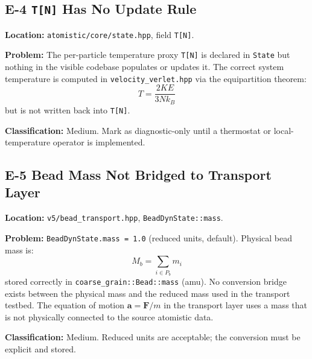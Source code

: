 \documentclass[11pt,a4paper]{article}
\begin{document}
\subsection{E-4 \textemdash{} \texttt{T[N]} Has No Update Rule}
\begin{mdframed}[backgroundcolor=amber!8]
\textbf{Location:} \texttt{atomistic/core/state.hpp}, field \texttt{T[N]}.

\textbf{Problem:} The per-particle temperature proxy \texttt{T[N]} is declared
in \texttt{State} but nothing in the visible codebase populates or updates it.
The correct system temperature is computed in \texttt{velocity\_verlet.hpp}
via the equipartition theorem:
\[
T = \frac{2KE}{3Nk_B}
\]
but is not written back into \texttt{T[N]}.

\textbf{Classification:} Medium. Mark as diagnostic-only until a
thermostat or local-temperature operator is implemented.
\end{mdframed}

\subsection{E-5 \textemdash{} Bead Mass Not Bridged to Transport Layer}
\begin{mdframed}[backgroundcolor=amber!8]
\textbf{Location:} \texttt{v5/bead\_transport.hpp}, \texttt{BeadDynState::mass}.

\textbf{Problem:} \texttt{BeadDynState.mass = 1.0} (reduced units, default).
Physical bead mass is:
\[
M_b = \sum_{i \in P_b} m_i
\]
stored correctly in \texttt{coarse\_grain::Bead::mass} (amu).
No conversion bridge exists between the physical mass and the reduced mass
used in the transport testbed. The equation of motion $\mathbf{a} = \mathbf{F}/m$
in the transport layer uses a mass that is not physically connected to the
source atomistic data.

\textbf{Classification:} Medium. Reduced units are acceptable; the
conversion must be explicit and stored.
\end{mdframed}
\end{document}

